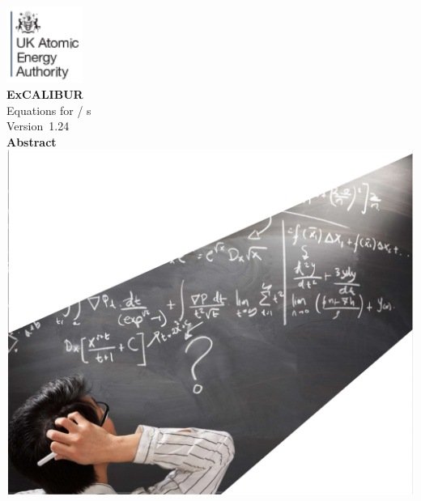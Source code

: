 \documentclass[11pt,twoside,a4paper]{article}
\newcommand{\culhamissueno}{1.24}%
\newcommand{\culhamtitle}{\LARGE Equations for \exc/\nep \; \Papp s  \\[1.0\baselineskip] Version~\culhamissueno }%
\begin{document}
\begin{titlepage}
\includegraphics[width=2.5cm]{../corpics/cofaplus} \\[2.0\baselineskip]
{\LARGE {\textbf{\textsf{ExCALIBUR}}}}\\[2.0\baselineskip]
{\LARGE \culhamtitle } \\[2.0\baselineskip]
{\textbf{\textsf{Abstract}}}\\

\vspace*{-100mm}
\hspace{-50mm}\includegraphics[width=22.0cm]{../corpics/eqs1}
\end{titlepage}

\clearpage
%
\end{document}

